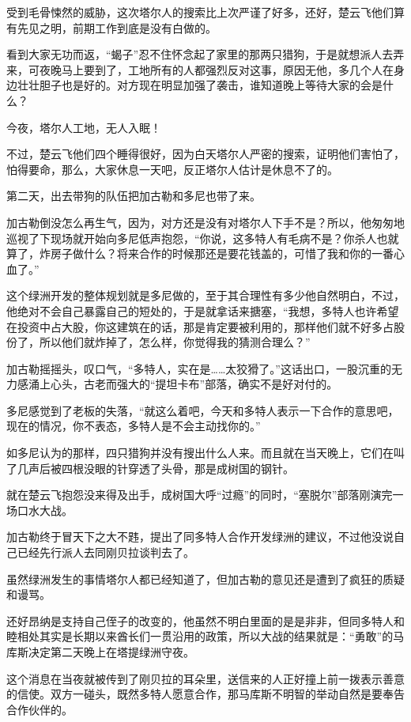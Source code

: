 受到毛骨悚然的威胁，这次塔尔人的搜索比上次严谨了好多，还好，楚云飞他们算有先见之明，前期工作到底是没有白做的。

看到大家无功而返，“蝎子”忍不住怀念起了家里的那两只猎狗，于是就想派人去弄来，可夜晚马上要到了，工地所有的人都强烈反对这事，原因无他，多几个人在身边壮壮胆子也是好的。对方现在明显加强了袭击，谁知道晚上等待大家的会是什么？

今夜，塔尔人工地，无人入眠！

不过，楚云飞他们四个睡得很好，因为白天塔尔人严密的搜索，证明他们害怕了，怕得要命，那么，大家休息一天吧，反正塔尔人估计是休息不了的。

第二天，出去带狗的队伍把加古勒和多尼也带了来。

加古勒倒没怎么再生气，因为，对方还是没有对塔尔人下手不是？所以，他匆匆地巡视了下现场就开始向多尼低声抱怨，“你说，这多特人有毛病不是？你杀人也就算了，炸房子做什么？将来合作的时候那还是要花钱盖的，可惜了我和你的一番心血了。”

这个绿洲开发的整体规划就是多尼做的，至于其合理性有多少他自然明白，不过，他绝对不会自己暴露自己的短处的，于是就拿话来搪塞，“我想，多特人也许希望在投资中占大股，你这建筑在的话，那是肯定要被利用的，那样他们就不好多占股份了，所以他们就炸掉了，怎么样，你觉得我的猜测合理么？”

加古勒摇摇头，叹口气，“多特人，实在是……太狡猾了。”这话出口，一股沉重的无力感涌上心头，古老而强大的“提坦卡布”部落，确实不是好对付的。

多尼感觉到了老板的失落，“就这么着吧，今天和多特人表示一下合作的意思吧，现在的情况，你不表态，多特人是不会主动找你的。”

如多尼认为的那样，四只猎狗并没有搜出什么人来。而且就在当天晚上，它们在叫了几声后被四根没眼的针穿透了头骨，那是成树国的钢针。

就在楚云飞抱怨没来得及出手，成树国大呼“过瘾”的同时，“塞脱尔”部落刚演完一场口水大战。

加古勒终于冒天下之大不韪，提出了同多特人合作开发绿洲的建议，不过他没说自己已经先行派人去同刚贝拉谈判去了。

虽然绿洲发生的事情塔尔人都已经知道了，但加古勒的意见还是遭到了疯狂的质疑和谩骂。

还好昂纳是支持自己侄子的改变的，他虽然不明白里面的是是非非，但同多特人和睦相处其实是长期以来酋长们一贯沿用的政策，所以大战的结果就是：“勇敢”的马库斯决定第二天晚上在塔提绿洲守夜。

这个消息在当夜就被传到了刚贝拉的耳朵里，送信来的人正好撞上前一拨表示善意的信使。双方一碰头，既然多特人愿意合作，那马库斯不明智的举动自然是要奉告合作伙伴的。

